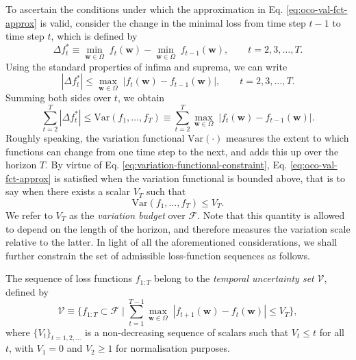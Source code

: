 To ascertain the conditions under which the approximation in Eq. \eqref{eq:oco-val-fct-approx} is valid, consider the change in the minimal loss from time step $t-1$ to time step $t$, which is defined by
\begin{equation}
\label{eq:minimal-loss-delta}
	\Delta f_t^*
	\equiv \min_{\mathbf{w}\in\Omega} \; f_t(\mathbf{w}) - \min_{\mathbf{w}\in\Omega} \; f_{t-1}(\mathbf{w}),
	\qquad t = 2, 3, \ldots, T.
\end{equation}
Using the standard properties of infima and suprema, we can write
\begin{equation}
\label{eq:minimal-loss-delta-prop}
	|\Delta f_t^*|
	\leq \max_{\mathbf{w}\in\Omega} \; |f_t(\mathbf{w}) - f_{t-1}(\mathbf{w})|,
	\qquad t = 2, 3, \ldots, T.
\end{equation}
Summing both sides over $t$, we obtain
\begin{equation}
\label{eq:variation-functional-constraint}
	\sum_{t=2}^{T} |\Delta f_t^*|
	\leq \mathrm{Var}(f_1, \ldots, f_T)
	\equiv \sum_{t=2}^{T} \max_{\mathbf{w}\in\Omega} \; |f_t(\mathbf{w}) - f_{t-1}(\mathbf{w})|.
\end{equation}
Roughly speaking, the variation functional $\mathrm{Var}(\cdot)$ measures the extent to which functions can change from one time step to the next, and adds this up over the horizon $T$.
By virtue of Eq. \eqref{eq:variation-functional-constraint}, Eq. \eqref{eq:oco-val-fct-approx} is satisfied when the variation functional is bounded above, that is to say when there exists a scalar $V_T$ such that
\begin{equation}
	\mathrm{Var}(f_1, \ldots, f_T) \leq V_T.
\end{equation}
We refer to $V_T$ as the \emph{variation budget} over $\mathcal{F}$. Note that this quantity is allowed to depend on the length of the horizon, and therefore measures the variation scale relative to the latter. In light of all the aforementioned considerations, we shall further constrain the set of admissible loss-function sequences as follows.
\begin{assumption}
\label{ass:functional-variation}
The sequence of loss functions $f_{1:T}$ belong to the \emph{temporal uncertainty set} $\mathcal{V}$, defined by
\begin{equation}
\label{eq:temporal-uncertainty-set}
	\mathcal{V}
	\equiv \Big\{f_{1:T} \subset \mathcal{F} \; \Big| \; \sum_{t=1}^{T-1} \max_{\mathbf{w}\in\Omega} \; |f_{t+1}(\mathbf{w}) - f_t(\mathbf{w})| \leq V_T\Big\},
\end{equation}
where $\{V_t\}_{t=1, 2, \ldots}$ is a non-decreasing sequence of scalars such that $V_t \leq t$ for all $t$, with $V_1 = 0$ and $V_2 \geq 1$ for normalisation purposes.
\end{assumption}
